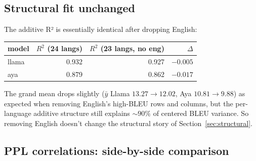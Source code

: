 \documentclass[11pt]{article}
\begin{document}
\subsection{Structural fit unchanged}

The additive R² is essentially identical after dropping English:

\begin{center}
\small
\begin{tabular}{lrrr}
\toprule
model & $R^2$ (24 langs) & $R^2$ (23 langs, no eng) & $\Delta$ \\
\midrule
llama & 0.932 & 0.927 & $-0.005$ \\
aya   & 0.879 & 0.862 & $-0.017$ \\
\bottomrule
\end{tabular}
\end{center}

The grand mean drops slightly ($\bar y$ Llama $13.27 \to 12.02$, Aya
$10.81 \to 9.88$) as expected when removing English's high-BLEU rows
and columns, but the per-language additive structure still explains
$\sim 90\%$ of centered BLEU variance. So removing English doesn't
change the structural story of Section~\ref{sec:structural}.

\subsection{PPL correlations: side-by-side comparison}
\end{document}
